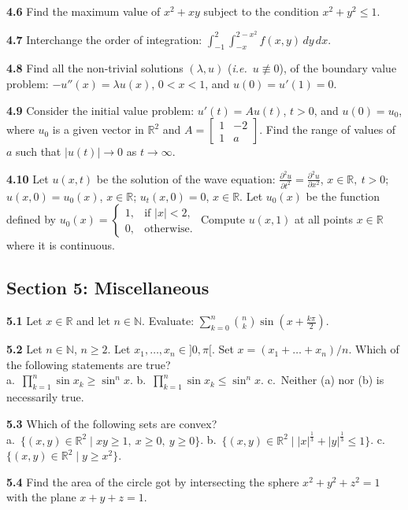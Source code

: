 \documentclass[11pt,a4paper]{article}
\newcommand{\N}{\mathbb{N}}
\newcommand{\R}{\mathbb{R}}
\newcommand{\examsec}[1]{%
  \subsection*{#1}
  \vspace{-2pt}
}
\newcommand{\qitem}[1]{\par\medskip\noindent\textbf{#1}\hspace{0.5em}}
\begin{document}
\qitem{4.6} Find the maximum value of $x^2 + xy$ subject to the condition $x^2 + y^2 \le 1$.

\qitem{4.7} Interchange the order of integration: $\displaystyle\int_{-1}^{2}\int_{-x}^{2-x^2} f(x, y)\,dy\,dx$.

\qitem{4.8} Find all the non-trivial solutions $(\lambda, u)$ (\emph{i.e.}\ $u \not\equiv 0$), of the boundary value problem: $-u''(x) = \lambda u(x)$, $0 < x < 1$, and $u(0) = u'(1) = 0$.

\qitem{4.9} Consider the initial value problem: $u'(t) = Au(t)$, $t > 0$, and $u(0) = u_0$, where $u_0$ is a given vector in $\R^2$ and $A = \begin{bmatrix} 1 & -2 \\ 1 & a \end{bmatrix}$. Find the range of values of $a$ such that $|u(t)| \to 0$ as $t \to \infty$.

\qitem{4.10} Let $u(x, t)$ be the solution of the wave equation: $\frac{\partial^2 u}{\partial t^2} = \frac{\partial^2 u}{\partial x^2}$, $x \in \R,\ t > 0$; $u(x, 0) = u_0(x)$, $x \in \R$; $u_t(x, 0) = 0$, $x \in \R$. Let $u_0(x)$ be the function defined by $u_0(x) = \begin{cases} 1, & \text{if } |x| < 2, \\ 0, & \text{otherwise.} \end{cases}$ Compute $u(x, 1)$ at all points $x \in \R$ where it is continuous.

\examsec{Section 5: Miscellaneous}

\qitem{5.1} Let $x \in \R$ and let $n \in \N$. Evaluate: $\displaystyle\sum_{k=0}^{n} \binom{n}{k}\sin\left(x + \frac{k\pi}{2}\right)$.

\qitem{5.2} Let $n \in \N$, $n \ge 2$. Let $x_1, \dots, x_n \in ]0, \pi[$. Set $x = (x_1 + \dots + x_n)/n$. Which of the following statements are true?\\
a.\ $\prod_{k=1}^{n} \sin x_k \ge \sin^n x$. \qquad b.\ $\prod_{k=1}^{n} \sin x_k \le \sin^n x$. \qquad c.\ Neither (a) nor (b) is necessarily true.

\qitem{5.3} Which of the following sets are convex?\\
a.\ $\{(x, y) \in \R^2 \mid xy \ge 1,\ x \ge 0,\ y \ge 0\}$. \qquad b.\ $\{(x, y) \in \R^2 \mid |x|^{\frac{1}{3}} + |y|^{\frac{1}{3}} \le 1\}$. \qquad c.\ $\{(x, y) \in \R^2 \mid y \ge x^2\}$.

\qitem{5.4} Find the area of the circle got by intersecting the sphere $x^2 + y^2 + z^2 = 1$ with the plane $x + y + z = 1$.
\end{document}

